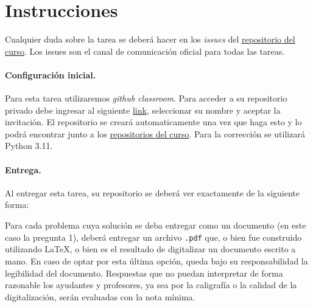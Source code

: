 
\section*{Instrucciones}

Cualquier duda sobre la tarea se deberá hacer en los \emph{issues} del \href{https://github.com/IIC3253/2025}{repositorio del curso}. Los issues son el canal de comunicación oficial para todas las tareas.

\paragraph{Configuración inicial.} 
Para esta tarea utilizaremos \textit{github classroom}. 
Para acceder a su repositorio privado debe ingresar al siguiente \href{https://classroom.github.com/a/ZjiQ8NjP}{link}, seleccionar su nombre y aceptar la invitación.
El repositorio se creará automaticamente una vez que haga esto y lo podrá encontrar junto a los \href{https://github.com/orgs/IIC3253/repositories}{repositorios del curso}.
Para la corrección se utilizará Python 3.11.

\paragraph{Entrega.} Al entregar esta tarea, su repositorio se deberá ver exactamente de la siguiente forma:

\bigskip


\bigskip

Para cada problema cuya solución se deba entregar como un documento (en este caso la pregunta 1), deberá entregar un archivo \texttt{.pdf} que, o bien fue construido utilizando \LaTeX, o bien es el resultado de digitalizar un documento escrito a mano. En caso de optar por esta última opción, queda bajo su responsabilidad la legibilidad del documento. Respuestas que no puedan interpretar de forma razonable los ayudantes y profesores, ya sea por la caligrafía o la calidad de la digitalización, serán evaluadas con la nota mínima.
